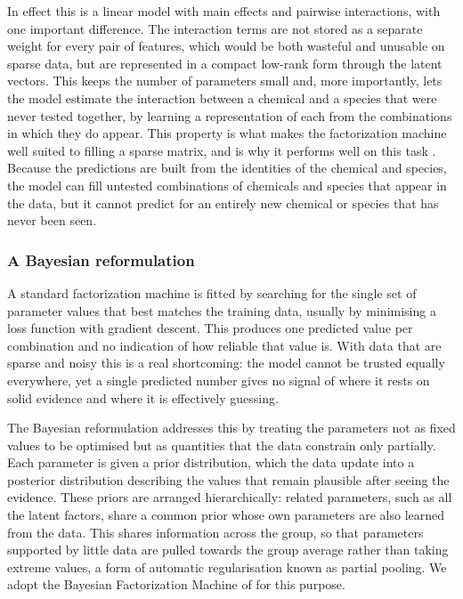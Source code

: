 In effect this is a linear model with main effects and pairwise interactions, with one important difference. The interaction terms are not stored as a separate weight for every pair of features, which would be both wasteful and unusable on sparse data, but are represented in a compact low-rank form through the latent vectors. This keeps the number of parameters small and, more importantly, lets the model estimate the interaction between a chemical and a species that were never tested together, by learning a representation of each from the combinations in which they do appear. This property is what makes the factorization machine well suited to filling a sparse matrix, and is why it performs well on this task \citep{Viljanen2023, PosthumaImprovingHazard}. Because the predictions are built from the identities of the chemical and species, the model can fill untested combinations of chemicals and species that appear in the data, but it cannot predict for an entirely new chemical or species that has never been seen. 

\subsubsection{A Bayesian reformulation}

A standard factorization machine is fitted by searching for the single set of parameter values that best matches the training data, usually by minimising a loss function with gradient descent. This produces one predicted value per combination and no indication of how reliable that value is. With data that are sparse and noisy this is a real shortcoming: the model cannot be trusted equally everywhere, yet a single predicted number gives no signal of where it rests on solid evidence and where it is effectively guessing.

The Bayesian reformulation addresses this by treating the parameters not as fixed values to be optimised but as quantities that the data constrain only partially. Each parameter is given a prior distribution, which the data update into a posterior distribution describing the values that remain plausible after seeing the evidence. These priors are arranged hierarchically: related parameters, such as all the latent factors, share a common prior whose own parameters are also learned from the data. This shares information across the group, so that parameters supported by little data are pulled towards the group average rather than taking extreme values, a form of automatic regularisation known as partial pooling. We adopt the Bayesian Factorization Machine of \citet{rendle2011bayesian} for this purpose.


